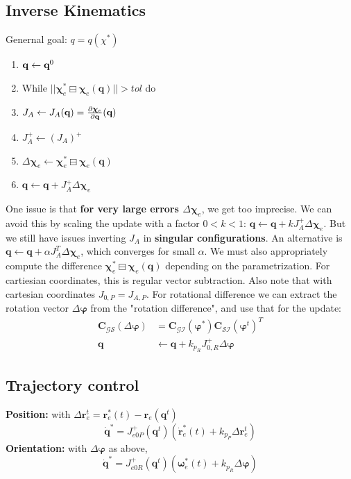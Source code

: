 \documentclass[a4paper, 8pt]{extarticle}
\newcommand{\mrot}[2]{ \textbf{#1}_{ \mathcal{#2} } }
\begin{document}
\begin{multicols*}{3}
\subsection{Inverse Kinematics}
Genernal goal: $q=q(\chi^*)$
\begin{enumerate}
\item $\mathbf q \leftarrow \textbf q^0$
\item While $||\bm\chi_e^* \boxminus \bm\chi_e(\mathbf q)|| > tol$ do
\item \hspace{1em} $J_A \leftarrow J_A(\textbf q) = \frac{\partial \bm\chi_e}{\partial \textbf q}(\textbf q)$
\item \hspace{1em} $J_A^+ \leftarrow (J_A)^+$
\item \hspace{1em} $\Delta\bm\chi_e \leftarrow \bm\chi_e^* \boxminus \bm\chi_e(\mathbf q)$
\item \hspace{1em} $\mathbf q \leftarrow \mathbf q + J_A^+\Delta\bm\chi_e$
\end{enumerate}
One issue is that \textbf{for very large errors $\Delta\bm\chi_e$}, we get too imprecise. We can avoid this by scaling the update with a factor $0 < k < 1$: $\mathbf q \leftarrow \mathbf q + kJ_A^+\Delta\bm\chi_e$. But we still have issues inverting $J_A$ in \textbf{singular configurations}. An alternative is $\mathbf q \leftarrow \mathbf q + \alpha J_A^T\Delta\bm\chi_e$, which converges for small $\alpha$.
We must also appropriately compute the difference $\bm\chi_e^* \boxminus \bm\chi_e(\mathbf q)$ depending on the parametrization. For cartiesian coordinates, this is regular vector subtraction. Also note that with cartesian coordinates $J_{0,P} = J_{A,P}$. For rotational difference we can extract the rotation vector $\Delta\bm\varphi$ from the "rotation difference", and use that for the update:
\begin{align*}
\mrot{C}{GS}(\Delta\bm\varphi) &= \mrot{C}{GI}(\bm\varphi^*)\mrot{C}{SI}(\bm\varphi^t)^{T}\\
\mathbf q &\leftarrow \mathbf q + k_{p_R}J_{0,R}^+\Delta\bm\varphi
\end{align*}



\subsection{Trajectory control}
\textbf{Position:} with $\Delta\mathbf r^t_e = \mathbf r^*_e(t) - \mathbf r_e(\mathbf q^t)$
$$\dot{\mathbf q}^* = J_{e0P}^+(\mathbf q^t) (\dot{\mathbf r}^*_e(t) + k_{p_P}\Delta\mathbf r^t_e)$$
\textbf{Orientation:} with $\Delta\bm\varphi$ as above,
$$\dot{\mathbf q}^* = J_{e0R}^+(\mathbf q^t) (\bm\omega^*_e(t) + k_{p_R}\Delta\bm\varphi)$$






\end{multicols*}
\end{document}
